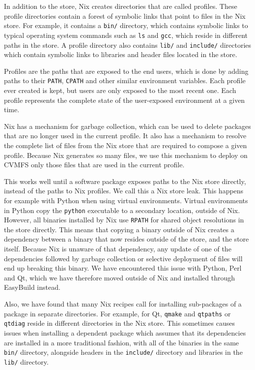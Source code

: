 \documentclass[sigconf]{acmart}
\begin{document}
In addition to the store, Nix creates directories that are called profiles. These profile directories contain a forest of symbolic links that point to files in the Nix store. For example, it contains a \texttt{bin/} directory, which contains symbolic links to typical operating system commands such as \texttt{ls} and \texttt{gcc}, which reside in different paths in the store. A profile directory also contains \texttt{lib/} and \texttt{include/} directories which contain symbolic links to libraries and header files located in the store. 

Profiles are the paths that are exposed to the end users, which is done by adding paths to their \texttt{PATH}, \texttt{CPATH} and other similar environment variables. Each profile ever created is kept, but users are only exposed to the most recent one. Each profile represents the complete state of the user-exposed environment at a given time.

Nix has a mechanism for garbage collection, which can be used to delete packages that are no longer used in the current profile. It also has a mechanism to resolve the complete list of files from the Nix store that are required to compose a given profile. Because Nix generates so many files, we use this mechanism to deploy on CVMFS only those files that are used in the current profile. 

This works well until a software package exposes paths to the Nix store directly, instead of the paths to Nix profiles. We call this a Nix store leak. This happens for example with Python when using virtual environments. Virtual environments in Python copy the \texttt{python} executable to a secondary location, outside of Nix. However, all binaries installed by Nix use \texttt{RPATH} for shared object resolutions in the store directly. This means that copying a binary outside of Nix creates a dependency between a binary that now resides outside of the store, and the store itself. Because Nix is unaware of that dependency, any update of one of the dependencies followed by garbage collection or selective deployment of files will end up breaking this binary. We have encountered this issue with Python, Perl and Qt, which we have therefore moved outside of Nix and installed through EasyBuild instead.

Also, we have found that many Nix recipes call for installing sub-packages of a package in separate directories. For example, for Qt, \texttt{qmake} and \texttt{qtpaths} or \texttt{qtdiag} reside in different directories in the Nix store. This sometimes causes issues when installing a dependent package which assumes that its dependencies are installed in a more traditional fashion, with all of the binaries in the same \texttt{bin/} directory, alongside headers in the \texttt{include/} directory and libraries in the \texttt{lib/} directory.  
\end{document}
